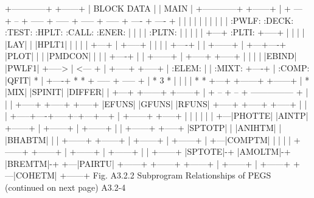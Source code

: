 \newpage {}
\begin{center}
\begin{boxedverbatim}
     +------------+         +------+
     | BLOCK DATA |         | MAIN |
     +------------+         +------+
                                |
     + --- + -- + ----- + ----- + ----- + ----- + ---- + ---- +
     |     |            |       |       |       |      |      |
     |     |         :PWLF:  :DECK:  :TEST:  :HPLT: :CALL: :ENER:
     |     |            |       |    :PLTN:     |      |
     |     |            |     +---+  :PLTI:  +-----+   |
     |     |            |     |LAY|     |    |HPLT1|   |
     |     |            |     +---+     |    +-----+   |
     |     |            |            +----+     |      |
  +------+ |        +---+----+       |PLOT|     |      |
  |PMDCON| |        |        |       +----+     |      |
  +------+ |     +-----+  +-----+       |       |      |
           |     |EBIND|  |PWLF1|       +-----> | <--- +
           |     +-----+  +-----+               |
        :ELEM:               |                  |
        :MIXT:            +----+                |
        :COMP:            |QFIT|                *
           |              +----+               * *
   + ----- + ----- +         |                * 3 *
   |       |       |         |                 * *
 +---+ +------+ +------+     |                  *
 |MIX| |SPINIT| |DIFFER|     |
 +---+ +------+ +------+     |
                        + -- + -- + --------------- +
                        |         |                 |
                     +-----+   +-----+           +-----+
                     |EFUNS|   |GFUNS|           |RFUNS|
                     +-----+   +-----+           +-----+
                        |         |                 |
    +-----+----+-----+--+---+---+ |   +------+   +-----+
    |     |    |     |      |   | +---|PHOTTE|   |AINTP|
 +------+ | +------+ | +------+ | |   +------+   +-----+
 |SPTOTP| | |ANIHTM| | |BHABTM| | |   +------+
 +------+ | +------+ | +------+ | +---|COMPTM|
          |          |          | |   +------+
 +------+ | +------+ | +------+ | |   +------+
 |SPTOTE|-+ |AMOLTM|-+ |BREMTM|-+ +---|PAIRTU|
 +------+   +------+   +------+   |   +------+
                                  |   +------+
                                  +---|COHETM|
                                      +------+
      Fig. A3.2.2  Subprogram Relationships of PEGS
                      (continued on next page)
 A3.2-4
\end{boxedverbatim}
\end{center}

